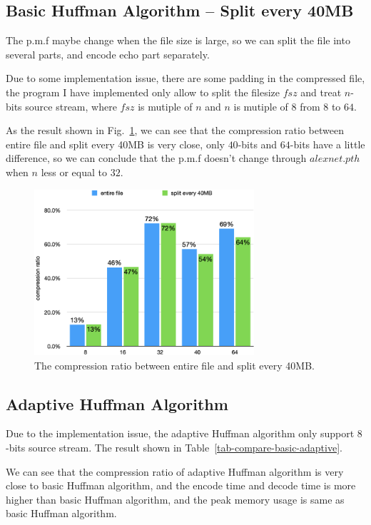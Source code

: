 \documentclass[a4paper,conference]{IEEEtran}
\begin{document}
\subsection{Basic Huffman Algorithm -- Split every 40MB}

The p.m.f maybe change when the file size is large, so we can split the file into several parts, and encode echo part separately.

Due to some implementation issue, there are some padding in the compressed file, the program I have implemented only allow to split the filesize $fsz$ and treat $n$-bits source stream, where $fsz$ is mutiple of $n$ and $n$ is mutiple of $8$ from $8$ to $64$.

As the result shown in Fig.~\ref{fig-chart-compression-ratio-split}, we can see that the compression ratio between entire file and split every 40MB is very close, only $40$-bits and $64$-bits have a little difference, so we can conclude that the p.m.f doesn't change through $alexnet.pth$ when $n$ less or equal to $32$.

\begin{figure}[htbp]
\centerline{\includegraphics[height=6.15cm, keepaspectratio,]{assets/chart-compression-ratio-split.png}}
\caption{The compression ratio between entire file and split every 40MB.}
\label{fig-chart-compression-ratio-split}
\end{figure}

\subsection{Adaptive Huffman Algorithm}

Due to the implementation issue, the adaptive Huffman algorithm only support $8$-bits source stream. The result shown in Table~\ref{tab-compare-basic-adaptive}.

We can see that the compression ratio of adaptive Huffman algorithm is very close to basic Huffman algorithm, and the encode time and decode time is more higher than basic Huffman algorithm, and the peak memory usage is same as basic Huffman algorithm.
\end{document}
